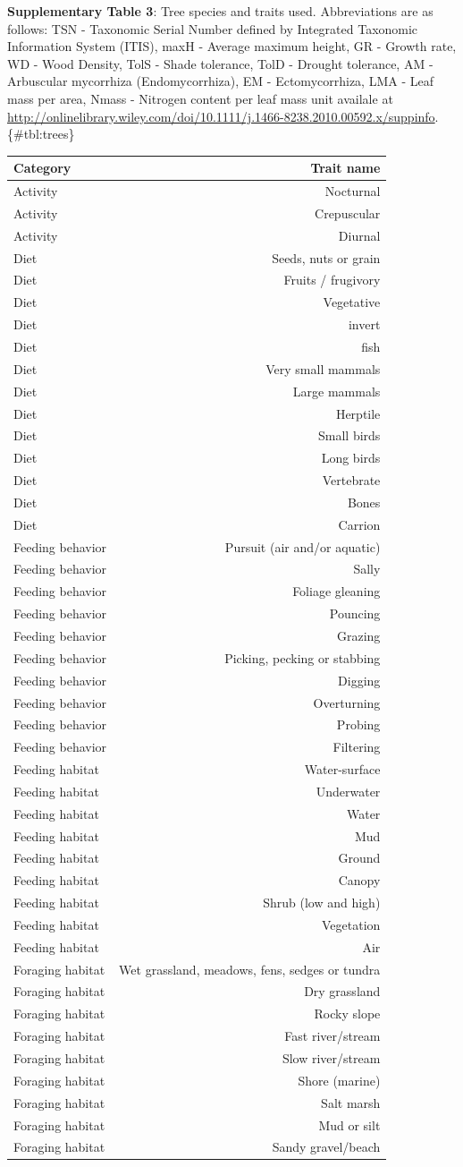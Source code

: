 \textbf{Supplementary Table 3}: Tree species and traits used.
Abbreviations are as follows: TSN - Taxonomic Serial Number defined by
Integrated Taxonomic Information System (ITIS), maxH - Average maximum
height, GR - Growth rate, WD - Wood Density, TolS - Shade tolerance,
TolD - Drought tolerance, AM - Arbuscular mycorrhiza (Endomycorrhiza),
EM - Ectomycorrhiza, LMA - Leaf mass per area, Nmass - Nitrogen content
per leaf mass unit\citep{Paquette_2010} availale at
\url{http://onlinelibrary.wiley.com/doi/10.1111/j.1466-8238.2010.00592.x/suppinfo}.\{\#tbl:trees\}

\begin{longtable}[]{@{}lr@{}}
\toprule
Category & Trait name\tabularnewline
\midrule
\endhead
Activity & Nocturnal\tabularnewline
Activity & Crepuscular\tabularnewline
Activity & Diurnal\tabularnewline
Diet & Seeds, nuts or grain\tabularnewline
Diet & Fruits / frugivory\tabularnewline
Diet & Vegetative\tabularnewline
Diet & invert\tabularnewline
Diet & fish\tabularnewline
Diet & Very small mammals\tabularnewline
Diet & Large mammals\tabularnewline
Diet & Herptile\tabularnewline
Diet & Small birds\tabularnewline
Diet & Long birds\tabularnewline
Diet & Vertebrate\tabularnewline
Diet & Bones\tabularnewline
Diet & Carrion\tabularnewline
Feeding behavior & Pursuit (air and/or aquatic)\tabularnewline
Feeding behavior & Sally\tabularnewline
Feeding behavior & Foliage gleaning\tabularnewline
Feeding behavior & Pouncing\tabularnewline
Feeding behavior & Grazing\tabularnewline
Feeding behavior & Picking, pecking or stabbing\tabularnewline
Feeding behavior & Digging\tabularnewline
Feeding behavior & Overturning\tabularnewline
Feeding behavior & Probing\tabularnewline
Feeding behavior & Filtering\tabularnewline
Feeding habitat & Water-surface\tabularnewline
Feeding habitat & Underwater\tabularnewline
Feeding habitat & Water\tabularnewline
Feeding habitat & Mud\tabularnewline
Feeding habitat & Ground\tabularnewline
Feeding habitat & Canopy\tabularnewline
Feeding habitat & Shrub (low and high)\tabularnewline
Feeding habitat & Vegetation\tabularnewline
Feeding habitat & Air\tabularnewline
Foraging habitat & Wet grassland, meadows, fens, sedges or
tundra\tabularnewline
Foraging habitat & Dry grassland\tabularnewline
Foraging habitat & Rocky slope\tabularnewline
Foraging habitat & Fast river/stream\tabularnewline
Foraging habitat & Slow river/stream\tabularnewline
Foraging habitat & Shore (marine)\tabularnewline
Foraging habitat & Salt marsh\tabularnewline
Foraging habitat & Mud or silt\tabularnewline
Foraging habitat & Sandy gravel/beach\tabularnewline

\end{longtable}
